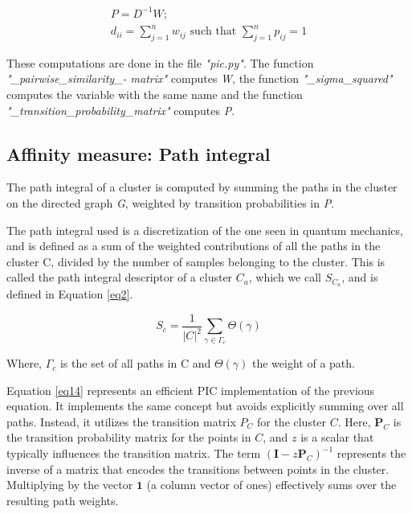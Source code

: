 \documentclass[
	10pt,
	parskip=half-,	
	paper=a4,
	english
	]{scrartcl}
\begin{document}
\begin{equation}
    \begin{split}
    P = D^{-1}W; 
    \\
    d_{ii} = \sum_{j=1}^n w_{ij}
    \text{ such that }
    \sum_{j=1}^n p_{ij}=1
    \end{split}
    \label{eq5}
\end{equation}

These computations are done in the file \textit{"pic.py"}. The function \textit{"\_pairwise\_similarity\_- matrix"} computes \textit{W}, the function \textit{"\_sigma\_squared"} computes the variable with the same name and the function \textit{"\_transition\_probability\_matrix"} computes \textit{P}.

\subsection{Affinity measure: Path integral}

The path integral of a cluster is computed by summing the paths in the cluster on the directed graph \textit{G}, weighted by transition probabilities in \textit{P}.

The path integral used is a discretization of the one seen in quantum mechanics, and is defined as a sum of the weighted contributions of all the paths in the cluster C, divided by the number of samples belonging to the cluster. This is called the path integral descriptor of a cluster \(C_a\), which we call \(S_{C_a}\), and is defined in Equation \ref{eq2}.

\begin{equation}
    S_c = \frac{1}{|C|^2}\sum_{\gamma\in\Gamma_c}{\Theta(\gamma)}
\label{eq2}
\end{equation}

Where, \(\Gamma_c\) is the set of all paths in C and \(\Theta(\gamma)\) the weight of a path.

Equation \ref{eq14} represents an efficient PIC implementation of the previous equation. It implements the same concept but avoids explicitly summing over all paths. Instead, it utilizes the transition matrix \( P_C \) for the cluster \( C \). Here, \( \boldsymbol{P}_C \) is the transition probability matrix for the points in \( C \), and \( z \) is a scalar that typically influences the transition matrix. The term \( (\boldsymbol{I} - z\boldsymbol{P}_C)^{-1} \) represents the inverse of a matrix that encodes the transitions between points in the cluster. Multiplying by the vector \( \boldsymbol{1} \) (a column vector of ones) effectively sums over the resulting path weights.
\end{document}
